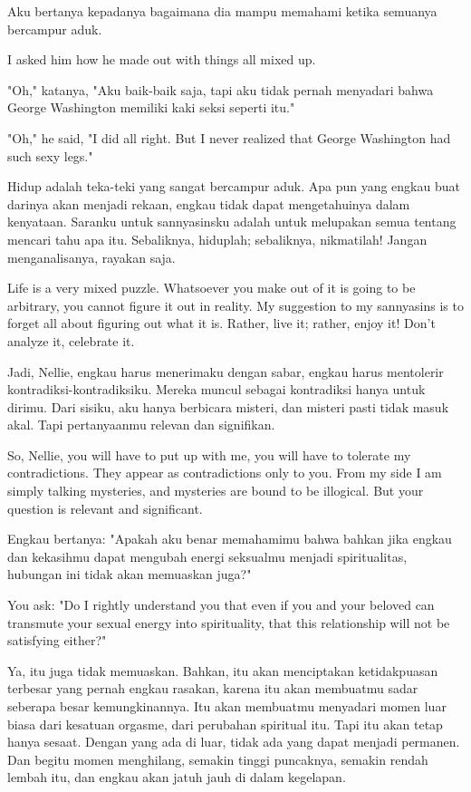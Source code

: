 \bahasa
Aku bertanya kepadanya bagaimana dia mampu memahami ketika semuanya bercampur aduk.

\english
I asked him how he made out with things all mixed up.

\bahasa
"Oh," katanya, "Aku baik-baik saja, tapi aku tidak pernah menyadari bahwa George Washington memiliki kaki seksi seperti itu."

\english
"Oh," he said, "I did all right. But I never realized that George Washington had such sexy legs."

\bahasa
Hidup adalah teka-teki yang sangat bercampur aduk. Apa pun yang engkau buat darinya akan menjadi rekaan, engkau tidak dapat mengetahuinya dalam kenyataan. Saranku untuk sannyasinsku adalah untuk melupakan semua tentang mencari tahu apa itu. Sebaliknya, hiduplah; sebaliknya, nikmatilah! Jangan menganalisanya, rayakan saja.

\english
Life is a very mixed puzzle. Whatsoever you make out of it is going to be arbitrary, you cannot figure it out in reality. My suggestion to my sannyasins is to forget all about figuring out what it is. Rather, live it; rather, enjoy it! Don't analyze it, celebrate it.

\bahasa
Jadi, Nellie, engkau harus menerimaku dengan sabar, engkau harus mentolerir kontradiksi-kontradiksiku. Mereka muncul sebagai kontradiksi hanya untuk dirimu. Dari sisiku, aku hanya berbicara misteri, dan misteri pasti tidak masuk akal. Tapi pertanyaanmu relevan dan signifikan.

\english
So, Nellie, you will have to put up with me, you will have to tolerate my contradictions. They appear as contradictions only to you. From my side I am simply talking mysteries, and mysteries are bound to be illogical. But your question is relevant and significant.

\bahasa
Engkau bertanya: "Apakah aku benar memahamimu bahwa bahkan jika engkau dan kekasihmu dapat mengubah energi seksualmu menjadi spiritualitas, hubungan ini tidak akan memuaskan juga?"

\english
You ask: "Do I rightly understand you that even if you and your beloved can transmute your sexual energy into spirituality, that this relationship will not be satisfying either?"

\bahasa
Ya, itu juga tidak memuaskan. Bahkan, itu akan menciptakan ketidakpuasan terbesar yang pernah engkau rasakan, karena itu akan membuatmu sadar seberapa besar kemungkinannya. Itu akan membuatmu menyadari momen luar biasa dari kesatuan orgasme, dari perubahan spiritual itu. Tapi itu akan tetap hanya sesaat. Dengan yang ada di luar, tidak ada yang dapat menjadi permanen. Dan begitu momen menghilang, semakin tinggi puncaknya, semakin rendah lembah itu, dan engkau akan jatuh jauh di dalam kegelapan.

